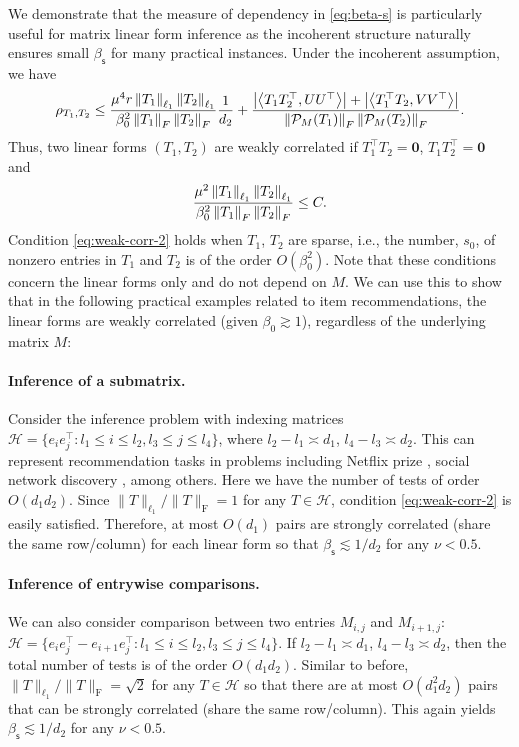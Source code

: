 \documentclass[12pt]{article}
\newcommand{\tF}{{\rm F}}
\newcommand{\abs}[1]{\left\lvert#1\right\rvert}
\newcommand{\norm}[1]{\left\lVert#1\right\rVert}
\newcommand{\cH}{\mathcal{H}}
\newcommand{\cP}{\mathcal{P}}
\def\calH{{\mathcal H}}
\theoremstyle{plain}
\begin{document}
\begin{sloppypar}
We demonstrate that the measure of dependency in \eqref{eq:beta-s} is particularly useful for matrix linear form inference as the incoherent structure naturally ensures small $\beta_{\mathsf{s} } $ for many practical instances. Under the incoherent assumption, we have
$$
\rho_{T_1,T_2}\le  \frac{ \mu^4 r \norm{T_1}_{\ell_1 }\norm{T_2}_{\ell_1 } }{\beta^2_0 \norm{T_1}_{\tF}\norm{T_2}_{\tF} }\frac{1}{d_2}+\frac{\abs{\left\langle T_1 T_2^\top , UU^\top \right\rangle} +\abs{\left\langle T_1^\top T_2 , VV^\top \right\rangle} }{\norm{\cP_M(T_1)}_\tF \norm{\cP_M(T_2)}_\tF}.
$$
Thus, two linear forms $(T_1, T_2)$ are weakly correlated if $T_1^\top T_2=\boldsymbol{0}$, $T_1 T_2^\top=\boldsymbol{0}$ and
\begin{equation}\label{eq:weak-corr-2}
		\frac{ \mu^2 \norm{T_1}_{\ell_1 }\norm{T_2}_{\ell_1 } }{\beta^2_0 \norm{T_1}_{\tF}\norm{T_2}_{\tF} } \le C.
\end{equation}
Condition \eqref{eq:weak-corr-2} holds when $T_1$, $T_2$ are sparse, i.e., the number, $s_0$, of nonzero entries in $T_1$ and $T_2$ is of the order $O(\beta_0^2)$. Note that these conditions concern the linear forms only and do not depend on $M$. We can use this to show that in the following practical examples related to item recommendations, the linear forms are weakly correlated (given $\beta_0\gtrsim 1$), regardless of the underlying matrix $M$:
\paragraph{Inference of a submatrix.} Consider the inference problem with indexing matrices $\calH=\{e_i e_j^\top : l_1\le i\le l_2, l_3\le j\le l_4  \}$, where $l_2-l_1 \asymp d_1 $, $l_4-l_3 \asymp d_2 $. This can represent recommendation tasks in problems including Netflix prize \citep{bennett2007netflix}, social network discovery \citep{pech2017link}, among others. Here we have the number of tests of order $O(d_1 d_2)$. Since $\|T\|_{\ell_1} /\|T\|_{\mathrm{F}}=1$ for any $T\in \cH$, condition \eqref{eq:weak-corr-2} is easily satisfied. Therefore, at most $O(d_1)$ pairs are strongly correlated (share the same row/column) for each linear form  so that $\beta_{\mathsf{s} }\lesssim 1/d_2$ for any $\nu<0.5$.  
	
\paragraph{Inference of entrywise comparisons.} We can also consider comparison between two entries $M_{i,j}$ and $M_{i+1,j}$: $\cH=\{e_{i} e_{j}^\top- e_{i+1} e_{j}^\top: l_1\le i\le l_2, l_3\le j\le l_4  \}$. If $l_2-l_1 \asymp d_1 $, $l_4-l_3 \asymp d_2 $, then the total number of tests is of the order $O(d_1 d_2)$. Similar to before, $\|T\|_{\ell_1} /\|T\|_{\mathrm{F}}=\sqrt{2}$ for any $T\in \cH$ so that there are at most $O(d_1^2 d_2)$ pairs that can be strongly correlated (share the same row/column). This again yields $\beta_{\mathsf{s} }\lesssim 1/{d_2}$ for any $\nu<0.5$.
	

\end{sloppypar}
\end{document}
